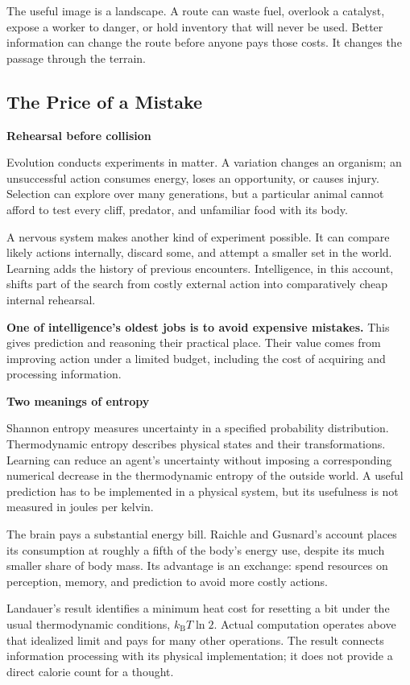 \documentclass[11pt,openany]{book}
\newcommand{\key}[1]{\textbf{#1}}
\newcommand{\subhead}[1]{\par\medskip\noindent\textbf{#1}\par\nobreak\smallskip}
\begin{document}
The useful image is a landscape. A route can waste fuel, overlook a catalyst, expose a worker to danger, or hold inventory that will never be used. Better information can change the route before anyone pays those costs. It changes the passage through the terrain.

\subsection{The Price of a Mistake}

\subhead{Rehearsal before collision}

Evolution conducts experiments in matter. A variation changes an organism; an unsuccessful action consumes energy, loses an opportunity, or causes injury. Selection can explore over many generations, but a particular animal cannot afford to test every cliff, predator, and unfamiliar food with its body.

A nervous system makes another kind of experiment possible. It can compare likely actions internally, discard some, and attempt a smaller set in the world. Learning adds the history of previous encounters. Intelligence, in this account, shifts part of the search from costly external action into comparatively cheap internal rehearsal.

\key{One of intelligence's oldest jobs is to avoid expensive mistakes.} This gives prediction and reasoning their practical place. Their value comes from improving action under a limited budget, including the cost of acquiring and processing information.

\subhead{Two meanings of entropy}

Shannon entropy measures uncertainty in a specified probability distribution.\cite{shannon1948} Thermodynamic entropy describes physical states and their transformations. Learning can reduce an agent's uncertainty without imposing a corresponding numerical decrease in the thermodynamic entropy of the outside world. A useful prediction has to be implemented in a physical system, but its usefulness is not measured in joules per kelvin.

The brain pays a substantial energy bill. Raichle and Gusnard's account places its consumption at roughly a fifth of the body's energy use, despite its much smaller share of body mass.\cite{raichle2002} Its advantage is an exchange: spend resources on perception, memory, and prediction to avoid more costly actions.

Landauer's result identifies a minimum heat cost for resetting a bit under the usual thermodynamic conditions, $k_{\mathrm B}T\ln2$.\cite{landauer1961} Actual computation operates above that idealized limit and pays for many other operations. The result connects information processing with its physical implementation; it does not provide a direct calorie count for a thought.
\end{document}

